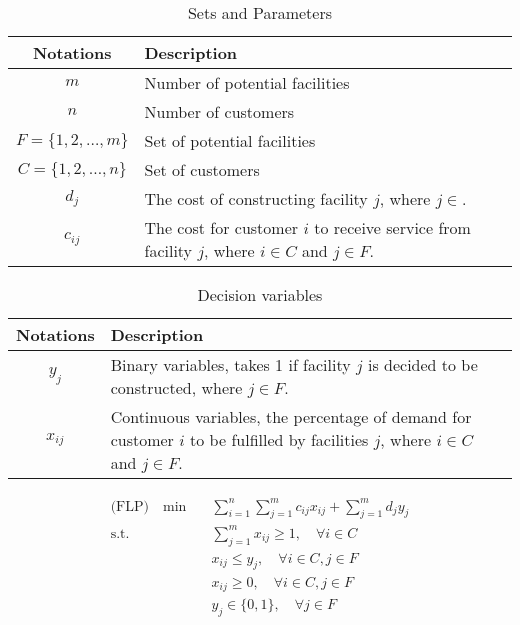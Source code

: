                 \begin{table}[!htp]
                    \centering
                    \caption{Sets and Parameters}
                    \begin{tabular}{c|p{8cm}}
                        \hline
                        \textbf{Notations} & \textbf{Description} \\
                        \hline
                        $m$ & Number of potential facilities\\
                        $n$ & Number of customers\\
                        $F = \{1, 2, \ldots, m\}$ & Set of potential facilities \\
                        $C = \{1, 2, \ldots, n\}$ & Set of customers\\
                        $d_j$ & The cost of constructing facility $j$, where $j \in $.\\
                        $c_{ij}$& The cost for customer $i$ to receive service from facility $j$, where $i \in C$ and $j \in F$.\\
                        \hline
                    \end{tabular}
                \end{table}

                \begin{table}[!htp]
                    \centering
                    \caption{Decision variables}
                    \begin{tabular}{c|p{8cm}}
                        \hline
                        \textbf{Notations} & \textbf{Description}\\
                        \hline
                        $y_j$ & Binary variables, takes 1 if facility $j$ is decided to be constructed, where $j \in F$.\\
                        $x_{ij}$ & Continuous variables, the percentage of demand for customer $i$ to be fulfilled by facilities $j$, where $i \in C$ and $j \in F$.\\
                        \hline
                    \end{tabular}
                \end{table}

                \begin{align}
                    \text{(FLP)} \quad \min \quad & \sum_{i = 1}^n \sum_{j = 1}^m c_{ij} x_{ij} + \sum_{j = 1}^m d_j y_j \nonumber\\
                    \text{s.t.} \quad &\sum_{j = 1}^m x_{ij} \ge 1, \quad \forall i \in C \label{cons:demand}\\
                        &x_{ij} \le y_j, \quad \forall i \in C, j \in F \label{cons:open}\\
                        &x_{ij} \ge 0, \quad \forall i \in C, j \in F \label{cons:nonnegX}\\
                        &y_{j} \in \{0, 1\}, \quad \forall j \in F \label{cons:nonnegY}
                \end{align}

